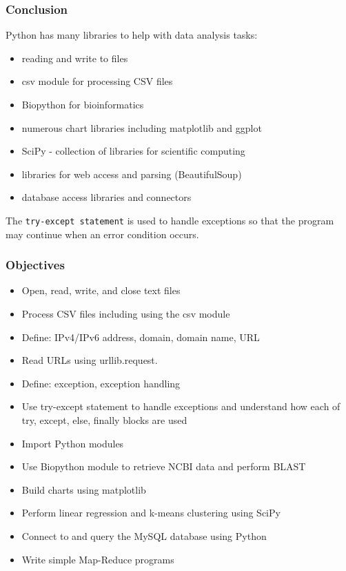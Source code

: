 \documentclass[xcolor=svgnames]{beamer}
\newcommand{\ft}[1]{\frametitle{#1}}
\begin{document}
\begin{frame}[fragile]\ft{Conclusion }
Python has many libraries to help with data analysis tasks:

\begin{itemize}
\item reading and write to files
\item csv module for processing CSV files
\item Biopython for bioinformatics
\item numerous chart libraries including matplotlib and ggplot
\item SciPy - collection of libraries for scientific computing
\item libraries for web access and parsing (BeautifulSoup)
\item database access libraries and connectors
\end{itemize}
The {\tt try-except statement} is used to handle exceptions so that the program may continue when an error condition occurs.

\end{frame}

\begin{frame}\ft{Objectives}
\begin{itemize}
\item Open, read, write, and close text files
\item Process CSV files including using the csv module
\item Define: IPv4/IPv6 address, domain, domain name, URL
\item Read URLs using urllib.request.
\item Define: exception, exception handling
\item Use try-except statement to handle exceptions and understand how each of try, except, else, finally blocks are used
\item Import Python modules
\item Use Biopython module to retrieve NCBI data and perform BLAST
\item Build charts using matplotlib
\item Perform linear regression and k-means clustering using SciPy
\item Connect to and query the MySQL database using Python
\item Write simple Map-Reduce programs

\end{itemize}

\end{frame}
\end{document}
